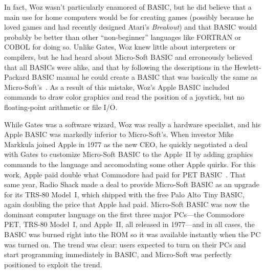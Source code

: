 \begin{tangent}

In fact, Woz wasn't particularly enamored of BASIC, but he did believe
that a main use for home computers would be
for creating games (possibly because he loved games and had recently
designed Atari's \emph{Breakout}) and that BASIC would probably be 
better than other ``non-beginner'' languages like FORTRAN or COBOL for
doing so.
Unlike Gates, Woz knew little about interpreters or compilers, but he
had heard about Micro-Soft BASIC and erroneously believed that
all BASICs were alike, and that by following 
the descriptions in the Hewlett-Packard BASIC manual he could create
a BASIC that was basically the same as Micro-Soft's~\cite{woz-commandlineheroes}. 
As a result of this mistake, Woz's Apple BASIC
included commands to draw color graphics and read the position of a
joystick, but no floating-point arithmetic or file I/O.

\end{tangent}



While Gates was a software wizard, Woz was really a hardware specialist, and
his Apple BASIC was markedly inferior to Micro-Soft's.
When investor Mike Markkula joined Apple in 1977
as the new CEO, he quickly negotiated a deal with Gates to customize
Micro-Soft BASIC to the Apple~II by adding graphics commands to the
language and accomodating some other Apple quirks.
For this work, Apple paid double what Commodore had
paid for PET BASIC~\cite[p. 114]{commodore}.
That same year, Radio Shack made a deal to provide Micro-Soft
BASIC as an upgrade for its TRS-80 Model~I, which shipped with 
the free Palo Alto Tiny BASIC,
again doubling the price that Apple had paid.
Micro-Soft BASIC was now the dominant computer language on the first
three major PCs---the Commodore PET, TRS-80 Model~I, and Apple~II, all
released in 1977---and in all cases, the BASIC was burned right into
the ROM so it was available instantly when the PC was turned on.
The trend was clear: users expected to turn on their PCs and start
programming immediately in BASIC,
and Micro-Soft was perfectly positioned to exploit the
trend.


